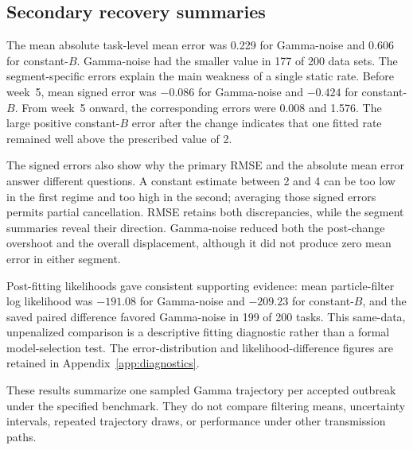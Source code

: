 \subsection{Secondary recovery summaries}

The mean absolute task-level mean error was 0.229 for Gamma-noise and 0.606
for constant-\(B\).  Gamma-noise had the smaller value in 177 of 200 data sets.
The segment-specific errors explain the main weakness of a single static rate.
Before week~5, mean signed error was \(-0.086\) for Gamma-noise and \(-0.424\)
for constant-\(B\).  From week~5 onward, the corresponding errors were 0.008
and 1.576.  The large positive constant-\(B\) error after the change indicates
that one fitted rate remained well above the prescribed value of 2.

The signed errors also show why the primary RMSE and the absolute mean error
answer different questions.  A constant estimate between 2 and 4 can be too
low in the first regime and too high in the second; averaging those signed
errors permits partial cancellation.  RMSE retains both discrepancies, while
the segment summaries reveal their direction.  Gamma-noise reduced both the
post-change overshoot and the overall displacement, although it did not
produce zero mean error in either segment.

Post-fitting likelihoods gave consistent supporting evidence: mean
particle-filter log likelihood was \(-191.08\) for Gamma-noise and \(-209.23\)
for constant-\(B\), and the saved paired difference favored Gamma-noise in 199
of 200 tasks.  This same-data, unpenalized comparison is a descriptive fitting
diagnostic rather than a formal model-selection test.  The error-distribution
and likelihood-difference figures are retained in
Appendix~\ref{app:diagnostics}.

These results summarize one sampled Gamma trajectory per accepted outbreak
under the specified benchmark.  They do not compare filtering means,
uncertainty intervals, repeated trajectory draws, or performance under other
transmission paths.
